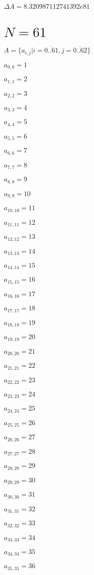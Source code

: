 \documentclass[a4paper,12pt]{article}
\begin{document}
$\Delta A = 8.320987112741392e81$



\section{ $N = 61$ }
$A = \{ a _{ i, j } | i = \overline { 0..61 }, j = \overline { 0..62 } \}$

$a _{ 0, 0 } = 1$

$a _{ 1, 1 } = 2$

$a _{ 2, 2 } = 3$

$a _{ 3, 3 } = 4$

$a _{ 4, 4 } = 5$

$a _{ 5, 5 } = 6$

$a _{ 6, 6 } = 7$

$a _{ 7, 7 } = 8$

$a _{ 8, 8 } = 9$

$a _{ 9, 9 } = 10$

$a _{ 10, 10 } = 11$

$a _{ 11, 11 } = 12$

$a _{ 12, 12 } = 13$

$a _{ 13, 13 } = 14$

$a _{ 14, 14 } = 15$

$a _{ 15, 15 } = 16$

$a _{ 16, 16 } = 17$

$a _{ 17, 17 } = 18$

$a _{ 18, 18 } = 19$

$a _{ 19, 19 } = 20$

$a _{ 20, 20 } = 21$

$a _{ 21, 21 } = 22$

$a _{ 22, 22 } = 23$

$a _{ 23, 23 } = 24$

$a _{ 24, 24 } = 25$

$a _{ 25, 25 } = 26$

$a _{ 26, 26 } = 27$

$a _{ 27, 27 } = 28$

$a _{ 28, 28 } = 29$

$a _{ 29, 29 } = 30$

$a _{ 30, 30 } = 31$

$a _{ 31, 31 } = 32$

$a _{ 32, 32 } = 33$

$a _{ 33, 33 } = 34$

$a _{ 34, 34 } = 35$

$a _{ 35, 35 } = 36$
\end{document}
